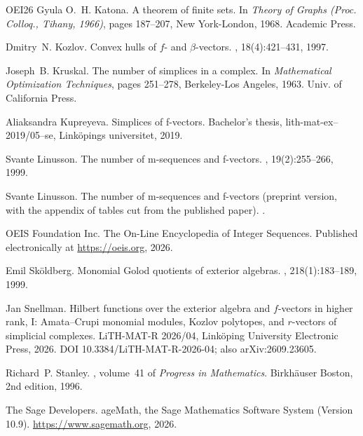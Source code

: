 \documentclass[11pt, a4paper, abstract=yes]{scrartcl}
\theoremstyle{definition}
\theoremstyle{remark}
\theoremstyle{plain}
\begin{document}
\begin{thebibliography}{{OEI}26}
Gyula O.~H. Katona.
\newblock A theorem of finite sets.
\newblock In {\em Theory of Graphs (Proc. Colloq., Tihany, 1966)}, pages
  187--207, New York-London, 1968. Academic Press.

Dmitry~N. Kozlov.
\newblock Convex hulls of $f$- and $\beta$-vectors.
, 18(4):421--431, 1997.

Joseph~B. Kruskal.
\newblock The number of simplices in a complex.
\newblock In {\em Mathematical Optimization Techniques}, pages 251--278,
  Berkeley-Los Angeles, 1963. Univ. of California Press.

Aliaksandra Kupreyeva.
\newblock Simplices of f-vectors.
\newblock Bachelor's thesis, lith-mat-ex--2019/05--se, Link{\"o}pings
  universitet, 2019.

Svante Linusson.
\newblock The number of m-sequences and f-vectors.
, 19(2):255--266, 1999.

Svante Linusson.
\newblock The number of m-sequences and f-vectors (preprint version, with the
  appendix of tables cut from the published paper).
.

{OEIS Foundation Inc.}
\newblock The {On-Line} {E}ncyclopedia of {I}nteger {S}equences.
\newblock Published electronically at \url{https://oeis.org}, 2026.

Emil Sk{\"o}ldberg.
\newblock Monomial {G}olod quotients of exterior algebras.
, 218(1):183--189, 1999.

Jan Snellman.
\newblock Hilbert functions over the exterior algebra and \(f\)-vectors in
  higher rank, {I}: {A}mata--{C}rupi monomial modules, {K}ozlov polytopes, and
  \(r\)-vectors of simplicial complexes.
\newblock LiTH-MAT-R 2026/04, Link{\"o}ping University Electronic Press, 2026.
\newblock DOI 10.3384/LiTH-MAT-R-2026-04; also arXiv:2609.23605.

Richard~P. Stanley.
, volume~41 of {\em
  Progress in Mathematics}.
\newblock Birkh{\"a}user Boston, 2nd edition, 1996.

{The Sage Developers}.
age{M}ath, the {S}age {M}athematics {S}oftware {S}ystem ({V}ersion
  10.9).
\newblock \url{https://www.sagemath.org}, 2026.

\end{thebibliography}
\end{document}
